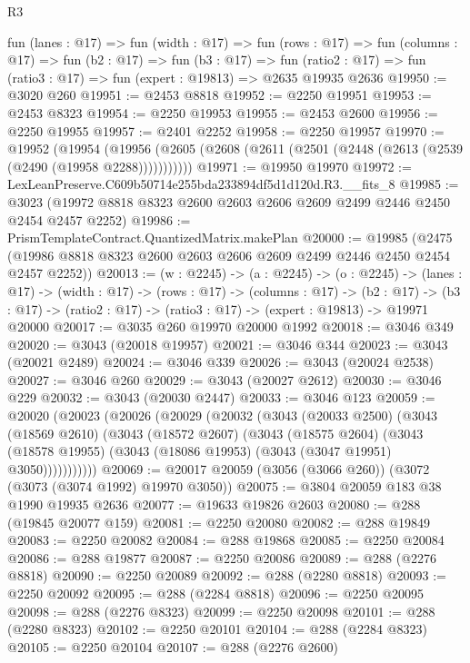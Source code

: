 \begin{lexlean}{R3}
\begin{coremodule}
  fun (lanes : @17) =>
  fun (width : @17) =>
  fun (rows : @17) =>
  fun (columns : @17) =>
  fun (b2 : @17) =>
  fun (b3 : @17) =>
  fun (ratio2 : @17) => fun (ratio3 : @17) => fun (expert : @19813) => @2635 @19935 @2636
@19950 := @3020 @260
@19951 := @2453 @8818
@19952 := @2250 @19951
@19953 := @2453 @8323
@19954 := @2250 @19953
@19955 := @2453 @2600
@19956 := @2250 @19955
@19957 := @2401 @2252
@19958 := @2250 @19957
@19970 := @19952
    (@19954 (@19956 (@2605 (@2608 (@2611 (@2501 (@2448 (@2613 (@2539 (@2490 (@19958 @2288)))))))))))
@19971 := @19950 @19970
@19972 := LexLeanPreserve.C609b50714e255bda233894df5d1d120d.R3.__fits_8
@19985 := @3023 (@19972 @8818 @8323 @2600 @2603 @2606 @2609 @2499 @2446 @2450 @2454 @2457 @2252)
@19986 := PrismTemplateContract.QuantizedMatrix.makePlan
@20000 := @19985
    (@2475 (@19986 @8818 @8323 @2600 @2603 @2606 @2609 @2499 @2446 @2450 @2454 @2457 @2252))
@20013 := (w : @2245) ->
  (a : @2245) ->
  (o : @2245) ->
  (lanes : @17) ->
  (width : @17) ->
  (rows : @17) ->
  (columns : @17) ->
  (b2 : @17) -> (b3 : @17) -> (ratio2 : @17) -> (ratio3 : @17) -> (expert : @19813) -> @19971 @20000
@20017 := @3035 @260 @19970 @20000 @1992
@20018 := @3046 @349
@20020 := @3043 (@20018 @19957)
@20021 := @3046 @344
@20023 := @3043 (@20021 @2489)
@20024 := @3046 @339
@20026 := @3043 (@20024 @2538)
@20027 := @3046 @260
@20029 := @3043 (@20027 @2612)
@20030 := @3046 @229
@20032 := @3043 (@20030 @2447)
@20033 := @3046 @123
@20059 := @20020
    (@20023
      (@20026
        (@20029
          (@20032
            (@3043
              (@20033 @2500)
              (@3043
                (@18569 @2610)
                (@3043
                  (@18572 @2607)
                  (@3043
                    (@18575 @2604)
                    (@3043
                      (@18578 @19955)
                      (@3043 (@18086 @19953) (@3043 (@3047 @19951) @3050)))))))))))
@20069 := @20017 @20059 (@3056 (@3066 @260)) (@3072 (@3073 (@3074 @1992) @19970 @3050))
@20075 := @3804 @20059 @183 @38 @1990 @19935 @2636
@20077 := @19633 @19826 @2603
@20080 := @288 (@19845 @20077 @159)
@20081 := @2250 @20080
@20082 := @288 @19849
@20083 := @2250 @20082
@20084 := @288 @19868
@20085 := @2250 @20084
@20086 := @288 @19877
@20087 := @2250 @20086
@20089 := @288 (@2276 @8818)
@20090 := @2250 @20089
@20092 := @288 (@2280 @8818)
@20093 := @2250 @20092
@20095 := @288 (@2284 @8818)
@20096 := @2250 @20095
@20098 := @288 (@2276 @8323)
@20099 := @2250 @20098
@20101 := @288 (@2280 @8323)
@20102 := @2250 @20101
@20104 := @288 (@2284 @8323)
@20105 := @2250 @20104
@20107 := @288 (@2276 @2600)

\end{coremodule}
\end{lexlean}
